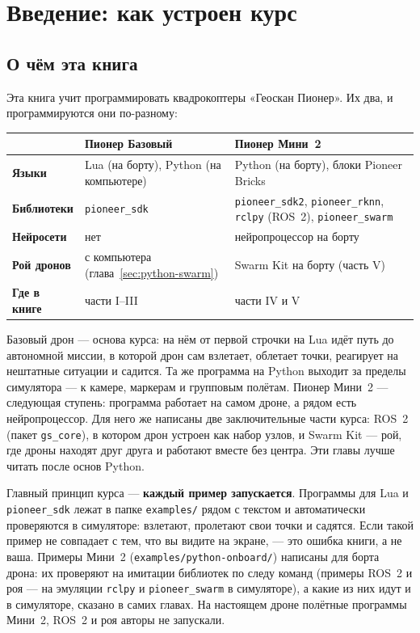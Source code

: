 \section{Введение: как устроен курс}

\subsection*{О чём эта книга}

Эта книга учит программировать квадрокоптеры «Геоскан Пионер». Их два, и программируются они по-разному:

\begin{center}
\small
\begin{tabularx}{\linewidth}{@{}>{\bfseries}l X X@{}}
\toprule
 & Пионер Базовый & Пионер Мини~2 \\
\midrule
Языки & Lua (на борту), Python (на компьютере) & Python (на борту), блоки Pioneer Bricks \\
Библиотеки & \texttt{pioneer\_sdk} & \texttt{pioneer\_sdk2}, \texttt{pioneer\_rknn}, \texttt{rclpy} (ROS~2), \texttt{pioneer\_swarm} \\
Нейросети & нет & нейропроцессор на борту \\
Рой дронов & с компьютера (глава~\ref{sec:python-swarm}) & Swarm Kit на борту (часть V) \\
Где в книге & части I--III & части IV и V \\
\bottomrule
\end{tabularx}
\end{center}

Базовый дрон --- основа курса: на нём от первой строчки на Lua идёт путь до автономной миссии, в которой дрон сам взлетает, облетает точки, реагирует на нештатные ситуации и садится. Та же программа на Python выходит за пределы симулятора --- к камере, маркерам и групповым полётам. Пионер Мини~2 --- следующая ступень: программа работает на самом дроне, а рядом есть нейропроцессор. Для него же написаны две заключительные части курса: ROS~2 (пакет \texttt{gs\_core}), в котором дрон устроен как набор узлов, и Swarm Kit --- рой, где дроны находят друг друга и работают вместе без центра. Эти главы лучше читать после основ Python.

Главный принцип курса --- \textbf{каждый пример запускается}. Программы для Lua и \texttt{pioneer\_sdk} лежат в папке \texttt{examples/} рядом с текстом и автоматически проверяются в симуляторе: взлетают, пролетают свои точки и садятся. Если такой пример не совпадает с тем, что вы видите на экране, --- это ошибка книги, а не ваша. Примеры Мини~2 (\texttt{examples/python-onboard/}) написаны для борта дрона: их проверяют на имитации библиотек по следу команд (примеры ROS~2 и роя --- на эмуляции \texttt{rclpy} и \texttt{pioneer\_swarm} в симуляторе), а какие из них идут и в симуляторе, сказано в самих главах. На настоящем дроне полётные программы Мини~2, ROS~2 и роя авторы не запускали.


